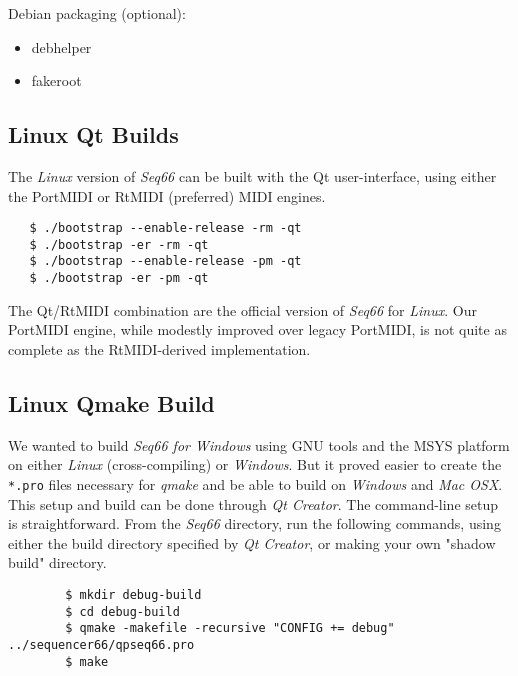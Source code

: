    Debian packaging (optional):

     \begin{itemize}
        \item debhelper
        \item fakeroot
     \end{itemize}

\subsection{Linux Qt Builds}
\label{subsec:build_Qt}

   The \textsl{Linux} version of \textsl{Seq66} can be built with the Qt
   user-interface, using either the PortMIDI or RtMIDI (preferred) MIDI
   engines.
 
\begin{verbatim}
   $ ./bootstrap --enable-release -rm -qt
   $ ./bootstrap -er -rm -qt
   $ ./bootstrap --enable-release -pm -qt
   $ ./bootstrap -er -pm -qt
\end{verbatim}

   The Qt/RtMIDI combination are the official version
   of \textsl{Seq66} for \textsl{Linux}.
   Our PortMIDI engine, while modestly improved over legacy PortMIDI, is not
   quite as complete as the RtMIDI-derived implementation.

\subsection{Linux Qmake Build}
\label{subsec:build_qmake}

   We wanted to build \textsl{Seq66 for Windows} using GNU tools and the
   MSYS platform on either \textsl{Linux} (cross-compiling) or
   \textsl{Windows}.  But it proved easier to create the
   \texttt{*.pro} files necessary for \textsl{qmake} and be able to build
   on \textsl{Windows} and \textsl{Mac OSX}.
   This setup and build can be done through \textsl{Qt Creator}.
   The command-line setup is straightforward.
   From the \textsl{Seq66} directory, run the following
   commands, using either the build directory specified by \textsl{Qt Creator},
   or making your own "shadow build" directory.

   \begin{verbatim}
        $ mkdir debug-build
        $ cd debug-build
        $ qmake -makefile -recursive "CONFIG += debug" ../sequencer66/qpseq66.pro
        $ make
   \end{verbatim}

